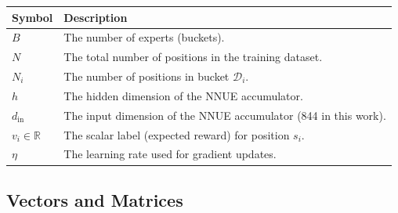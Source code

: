 \begin{center}
\small
\begin{tabularx}{\textwidth}{@{}l X@{}}
\hline
\textbf{Symbol} & \textbf{Description} \\
\hline
\(B\) & The number of experts (buckets). \\
\(N\) & The total number of positions in the training dataset. \\
\(N_i\) & The number of positions in bucket \(\mathcal{D}_i\). \\
\(h\) & The hidden dimension of the NNUE accumulator. \\
\(d_{\mathrm{in}}\) & The input dimension of the NNUE accumulator (844 in this work). \\
\(v_i \in \mathbb{R}\) & The scalar label (expected reward) for position \(s_i\). \\
\(\eta\) & The learning rate used for gradient updates. \\
\hline
\end{tabularx}
\end{center}

\subsection{Vectors and Matrices}\label{sec:notation-vectors}

